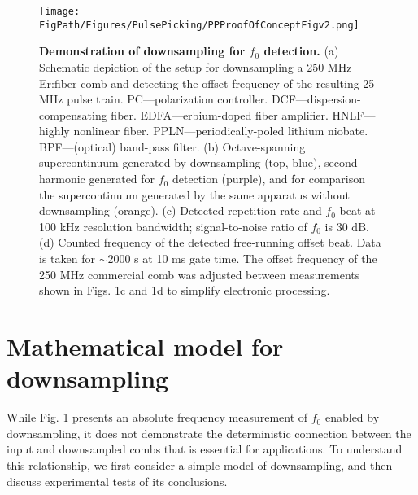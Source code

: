 \begin{figure}[htpb]
	\begin{center}
		\texttt{[image: \\FigPath/Figures/PulsePicking/PPProofOfConceptFigv2.png]}
	\end{center}
	\caption[Demonstration of downsampling for $f_0$ detection]{\textbf{Demonstration of downsampling for $f_0$ detection.} (a) Schematic depiction of the setup for downsampling a 250 MHz Er:fiber comb and detecting the offset frequency of the resulting 25 MHz pulse train. PC---polarization controller.  DCF---dispersion-compensating fiber. EDFA---erbium-doped fiber amplifier. HNLF---highly nonlinear fiber. PPLN---periodically-poled lithium niobate. BPF---(optical) band-pass filter. (b) Octave-spanning supercontinuum generated by downsampling (top, blue), second harmonic generated for $f_0$ detection (purple), and for comparison the supercontinuum generated by the same apparatus without downsampling (orange). (c) Detected repetition rate and $f_0$ beat at 100 kHz resolution bandwidth; signal-to-noise ratio of $f_0$ is 30 dB. (d) Counted frequency of the detected free-running offset beat. Data is taken for $\sim$2000 s at 10 ms gate time. The offset frequency of the 250 MHz commercial comb was adjusted between measurements shown in Figs. \ref{fig:PPDemo}c and \ref{fig:PPDemo}d to simplify electronic processing.}
	\label{fig:PPDemo}
\end{figure} 



\section{Mathematical model for downsampling}\label{sec:PPMath}
While Fig. \ref{fig:PPDemo} presents an absolute frequency measurement of $f_0$ enabled by downsampling, it does not demonstrate the deterministic connection between the input and downsampled combs that is essential for applications. To understand this relationship, we first consider a simple model of downsampling, and then discuss experimental tests of its conclusions.

